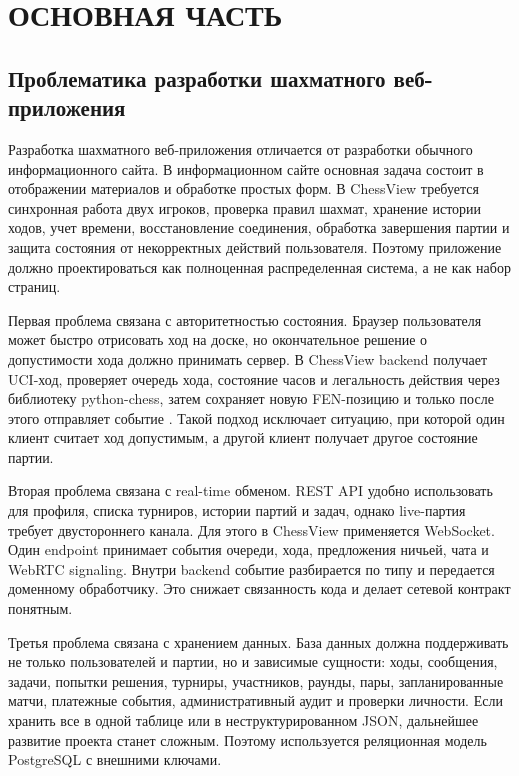 \chapter{ОСНОВНАЯ ЧАСТЬ}

\section{Проблематика разработки шахматного веб-приложения}

Разработка шахматного веб-приложения отличается от разработки обычного информационного сайта. В информационном сайте основная задача состоит в отображении материалов и обработке простых форм. В ChessView требуется синхронная работа двух игроков, проверка правил шахмат, хранение истории ходов, учет времени, восстановление соединения, обработка завершения партии и защита состояния от некорректных действий пользователя. Поэтому приложение должно проектироваться как полноценная распределенная система, а не как набор страниц.

Первая проблема связана с авторитетностью состояния. Браузер пользователя может быстро отрисовать ход на доске, но окончательное решение о допустимости хода должно принимать сервер. В ChessView backend получает UCI-ход, проверяет очередь хода, состояние часов и легальность действия через библиотеку python-chess, затем сохраняет новую FEN-позицию и только после этого отправляет событие . Такой подход исключает ситуацию, при которой один клиент считает ход допустимым, а другой клиент получает другое состояние партии.

Вторая проблема связана с real-time обменом. REST API удобно использовать для профиля, списка турниров, истории партий и задач, однако live-партия требует двустороннего канала. Для этого в ChessView применяется WebSocket. Один endpoint  принимает события очереди, хода, предложения ничьей, чата и WebRTC signaling. Внутри backend событие разбирается по типу и передается доменному обработчику. Это снижает связанность кода и делает сетевой контракт понятным.

Третья проблема связана с хранением данных. База данных должна поддерживать не только пользователей и партии, но и зависимые сущности: ходы, сообщения, задачи, попытки решения, турниры, участников, раунды, пары, запланированные матчи, платежные события, административный аудит и проверки личности. Если хранить все в одной таблице или в неструктурированном JSON, дальнейшее развитие проекта станет сложным. Поэтому используется реляционная модель PostgreSQL с внешними ключами.

